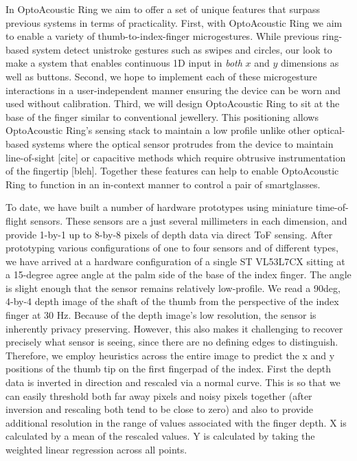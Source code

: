 \documentclass [11pt, proquest] {uwthesis}[2020/02/24]
\begin{document}
In OptoAcoustic Ring we aim to offer a set of unique features that surpass previous systems in terms of practicality. 
First, with OptoAcoustic Ring we aim to enable a variety of  thumb-to-index-finger microgestures. While previous ring-based system detect unistroke gestures such as swipes and circles, our look to make a system that  enables continuous 1D input in \textit{both} $x$ and $y$ dimensions as well as buttons.
Second, we hope to implement each of these microgesture interactions  in a user-independent manner ensuring the device can be worn and used without calibration.
Third, we will design OptoAcoustic Ring to sit at the base of the finger similar to conventional jewellery. This positioning allows OptoAcoustic Ring's sensing stack to maintain a low profile unlike other optical-based systems where the optical sensor protrudes from the device to maintain line-of-sight  [cite] or capacitive methods which require obtrusive instrumentation of the fingertip [bleh].
Together these features can help to enable OptoAcoustic Ring to function in an in-context manner to control a pair of smartglasses.

To date, we have built a number of hardware prototypes using  miniature time-of-flight sensors. These sensors are a just several millimeters in each dimension, and provide 1-by-1 up to 8-by-8 pixels of depth data via direct ToF sensing.
After prototyping various configurations of one to four sensors and of different types, we have arrived at a hardware configuration of a single ST VL53L7CX sitting at a 15-degree agree angle at the palm side of the base of the index finger. The angle is slight enough that the sensor remains relatively low-profile. We read a 90deg, 4-by-4 depth image of the shaft of the thumb from the perspective of the index finger at 30 Hz. Because of the depth image's low resolution, the sensor is inherently privacy preserving. However, this also makes it challenging to recover precisely what sensor is seeing, since there are no defining edges to distinguish. Therefore, we employ heuristics across the entire image to predict the x and y positions of the thumb tip on the first fingerpad of the index. First the depth data is inverted in direction and rescaled via a normal curve. This is so that we can easily threshold both far away pixels and noisy pixels together (after inversion and rescaling both tend to be close to zero) and also to provide additional resolution in the range of values associated with the finger depth. X is calculated by a mean of the rescaled values. Y is calculated by taking the weighted linear regression across all points. 
\end{document}
